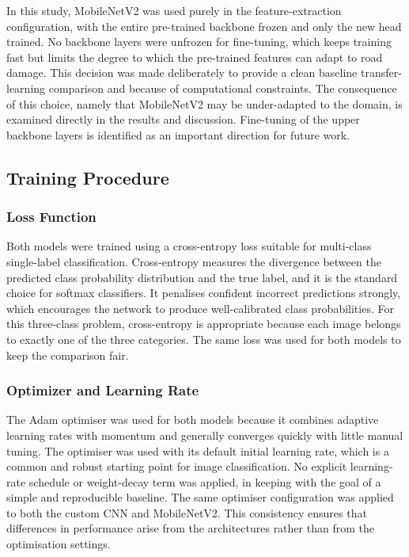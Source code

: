 \documentclass[preprint,12pt]{elsarticle}
\begin{document}
In this study, MobileNetV2 was used purely in the feature-extraction configuration, with the entire pre-trained backbone frozen and only the new head trained.
No backbone layers were unfrozen for fine-tuning, which keeps training fast but limits the degree to which the pre-trained features can adapt to road damage.
This decision was made deliberately to provide a clean baseline transfer-learning comparison and because of computational constraints.
The consequence of this choice, namely that MobileNetV2 may be under-adapted to the domain, is examined directly in the results and discussion.
Fine-tuning of the upper backbone layers is identified as an important direction for future work.

\subsection{Training Procedure}

\subsubsection{Loss Function}

Both models were trained using a cross-entropy loss suitable for multi-class single-label classification.
Cross-entropy measures the divergence between the predicted class probability distribution and the true label, and it is the standard choice for softmax classifiers.
It penalises confident incorrect predictions strongly, which encourages the network to produce well-calibrated class probabilities.
For this three-class problem, cross-entropy is appropriate because each image belongs to exactly one of the three categories.
The same loss was used for both models to keep the comparison fair.

\subsubsection{Optimizer and Learning Rate}

The Adam optimiser was used for both models because it combines adaptive learning rates with momentum and generally converges quickly with little manual tuning.
The optimiser was used with its default initial learning rate, which is a common and robust starting point for image classification.
No explicit learning-rate schedule or weight-decay term was applied, in keeping with the goal of a simple and reproducible baseline.
The same optimiser configuration was applied to both the custom CNN and MobileNetV2.
This consistency ensures that differences in performance arise from the architectures rather than from the optimisation settings.
\end{document}
